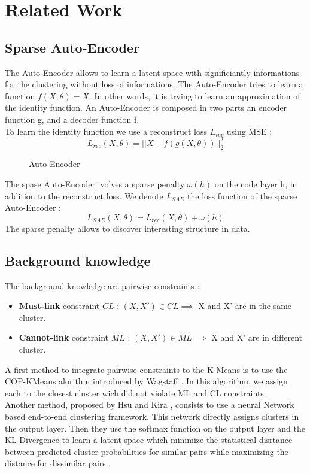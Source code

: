 \section{Related Work}\label{sec:related}

\subsection{Sparse Auto-Encoder}

The Auto-Encoder allows to learn a latent space with significiantly informations
for the clustering without loss of informations. The Auto-Encoder tries to learn
a function $f(X, \theta) = X$. In other words, it is trying to learn an
approximation of the identity function. An Auto-Encoder is composed in two
parts an encoder function g, and a decoder function f.\\
To learn the identity function we use a reconstruct loss $L_{rec}$ using MSE :
\begin{equation*}
  L_{rec}(X, \theta) = || X - f(g(X, \theta)) ||_2^2 
\end{equation*}

\begin{figure}[!h]
  \centering
  
  \caption{Auto-Encoder}
  \label{fig:AE}
\end{figure}
The spase Auto-Encoder ivolves a sparse penalty $\omega(h)$ on the code layer h,
in addition to the reconstruct loss. We  denote $L_{SAE}$ the loss function of
the sparse Auto-Encoder :
\begin{equation*}
  L_{SAE}(X, \theta) = L_{rec}(X, \theta) + \omega(h)
\end{equation*}
The sparse penalty allows to discover interesting structure in data.

\subsection{Background knowledge}

The background knowledge are pairwise constraints :
\begin{itemize}
\item \textbf{Must-link} constraint $CL$ : $(X, X') \in CL \implies $ X and X' are in the
  same cluster.
\item \textbf{Cannot-link} constraint $ML$ : $(X, X') \in ML \implies $ X and X' are in
  different cluster.
\end{itemize}
A first method to integrate pairwise constraints to the K-Means is to use the
COP-KMeans alorithm introduced by Wagstaff
\cite{Wagstaff:2001:CKC:645530.655669}. In this algorithm, we assign each to the
closest cluster wich did not violate ML and CL constraints.
\\Another method, proposed by Hsu and Kira \cite{2015arXiv151106321H}, consists to
use a neural Network based end-to-end clustering framework. This network
directly assigns clusters in the output layer. Then they use the softmax function
on the output layer and the KL-Divergence to learn a latent space which minimize
the statistical disrtance between predicted cluster probabilities for similar
pairs while maximizing the distance for dissimilar pairs.
